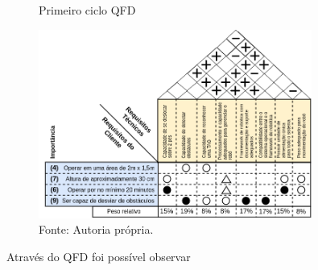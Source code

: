 \begin{figure} [h!]	
    \centering
    \caption{ Primeiro ciclo QFD}
    \includegraphics[width=0.8\textwidth]{Figures/QFD}
    \caption*{Fonte: Autoria própria.}
    \label{fig:QFD}
\end{figure}
 Através do QFD foi possível observar 



